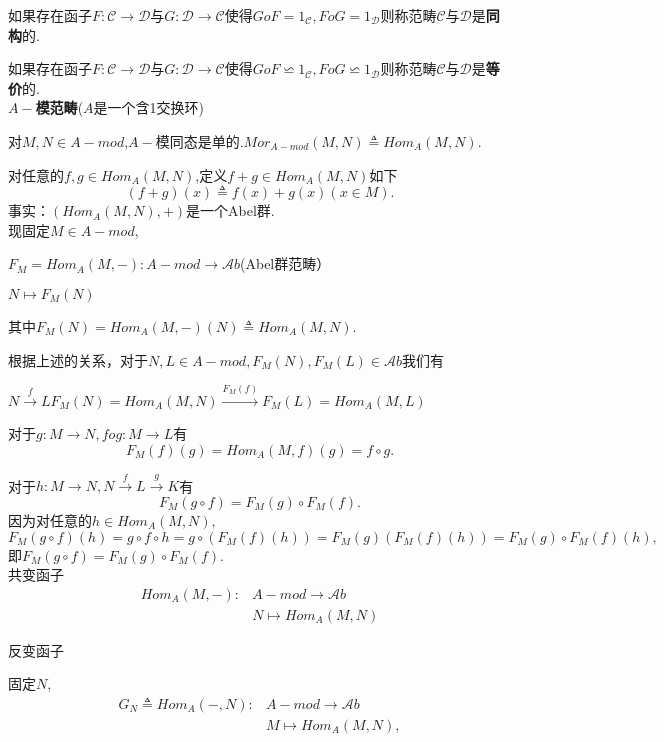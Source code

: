 \documentclass[UTF8]{article}
\begin{document}
如果存在函子$F:\mathscr{C}\longrightarrow \mathscr{D}$与$G:\mathscr{D}\longrightarrow \mathscr{C}$使得$GoF=1_{\mathscr{C}},FoG=1_{\mathscr{D}}$则称范畴$\mathscr{C}$与$\mathscr{D}$是\textbf{同构}的.


如果存在函子$F:\mathscr{C}\longrightarrow \mathscr{D}$与$G:\mathscr{D}\longrightarrow \mathscr{C}$使得$GoF\backsimeq 1_{\mathscr{C}},FoG\backsimeq 1_{\mathscr{D}}$则称范畴$\mathscr{C}$与$\mathscr{D}$是\textbf{等价}的.\\
\textbf{$A-$模范畴}($A$是一个含1交换环)

对$M,N\in A-mod$,$A-$模同态是单的.$Mor_{A-mod}(M,N)\triangleq Hom_{A}(M,N).$

对任意的$f,g\in Hom_{A}(M,N)$,定义$f+g\in Hom_{A}(M,N)$如下
$$(f+g)(x)\triangleq f(x)+g(x)(x\in M).$$
事实：$(Hom_{A}(M,N),+)$是一个Abel群.\\


现固定$M\in A-mod$,

$F_{M}=Hom_{A}(M,-):$\quad$A-mod\longrightarrow \mathscr{A}b$(Abel群范畴）

\qquad\qquad\qquad\qquad\qquad\qquad\qquad\qquad$N\longmapsto F_{M}(N)$

其中$ F_{M}(N)=Hom_{A}(M,-)(N)\triangleq Hom_{A}(M,N).$

根据上述的关系，对于$N,L\in A-mod,F_{M}(N),F_{M}(L)\in \mathscr{A}b$我们有

\qquad$N\xrightarrow{f}L$\qquad$F_{M}(N)=Hom_{A}(M,N)\xrightarrow{F_{M}(f)}F_{M}(L)=Hom_{A}(M,L)$

对于$g:M\longrightarrow N,fog:M\longrightarrow L$有
$$F_{M}(f)(g)=Hom_{A}(M,f)(g)=f\circ g.$$

对于$h:M\longrightarrow N,N\xrightarrow{f}L\xrightarrow{g}K$有
$$F_{M}(g\circ f)=F_{M}(g)\circ F_{M}(f).$$
因为对任意的$h\in Hom_{A}(M,N),$
$$F_{M}(g\circ f)(h)=g\circ f\circ h=g\circ(F_{M}(f)(h))=F_{M}(g)(F_{M}(f)(h))=F_{M}(g)\circ F_{M}(f)(h),$$
即$F_{M}(g\circ f)=F_{M}(g)\circ F_{M}(f).$\\


共变函子
\[
\begin{split}
Hom_{A}(M,-):&A-mod\longrightarrow \mathscr{A}b\\
&N\longmapsto Hom_{A}(M,N)
\end{split}
\]


反变函子

固定$N$,
\[
\begin{split}
G_{N}\triangleq Hom_{A}(-,N):&A-mod\longrightarrow \mathscr{A}b\\
&M\longmapsto Hom_{A}(M,N),
\end{split}
\]
\end{document}

